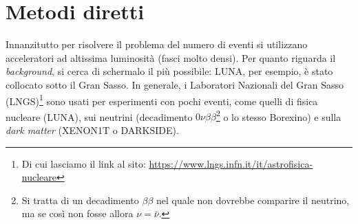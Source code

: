 \section{Metodi diretti}
Innanzitutto per risolvere il problema del numero di eventi si utilizzano acceleratori ad altissima luminosità (fasci molto densi). Per quanto riguarda il \textit{background}, si cerca di schermalo il più possibile: LUNA, per esempio, è stato collocato sotto il Gran Sasso. In generale, i Laboratori Nazionali del Gran Sasso (LNGS)\footnote{Di cui lasciamo il link al sito: \url{https://www.lngs.infn.it/it/astrofisica-nucleare}} sono usati per esperimenti con pochi eventi, come quelli di fisica nucleare (LUNA), sui neutrini (decadimento $0\nu\beta\beta$\footnote{Si tratta di un decadimento $\beta\beta$ nel quale non dovrebbe comparire il neutrino, ma se così non fosse allora $\nu=\bar{\nu}$.} o lo stesso Borexino) e sulla \textit{dark matter} (XENON1T o DARKSIDE).

